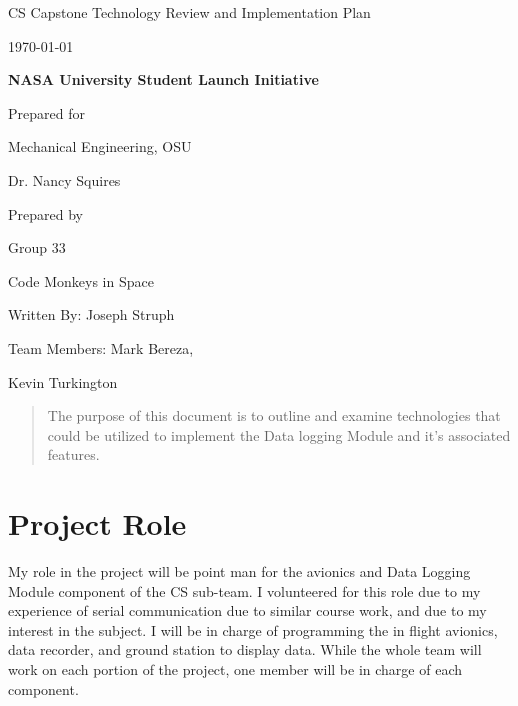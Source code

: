\documentclass[onecolumn, draftclsnofoot,10pt, compsoc]{IEEEtran}
\def \CapstoneTeamName{		Code Monkeys in Space}
\def \CapstoneTeamNumber{		33}
\def \GroupMemberOne{			Written By: Joseph Struph}
\def \GroupMemberTwo{			Team Members: Mark Bereza,}
\def \GroupMemberThree{			Kevin Turkington}
\def \CapstoneProjectName{		NASA University Student Launch Initiative}
\def \CapstoneSponsorCompany{	Mechanical Engineering, OSU}
\def \CapstoneSponsorPerson{		Dr. Nancy Squires}
\def \DocType{		Technology Review and Implementation Plan
				}
\newcommand{\NameSigPair}[1]{\par
\makebox[2.75in][r]{#1} \hfil 	\makebox[3.25in]{\makebox[2.25in]{\hrulefill} \hfill		\makebox[.75in]{\hrulefill}}
\par\vspace{-12pt} \textit{\tiny\noindent
\makebox[2.75in]{} \hfil		\makebox[3.25in]{\makebox[2.25in][r]{Signature} \hfill	\makebox[.75in][r]{Date}}}}
\renewcommand{\NameSigPair}[1]{#1}
\begin{document}
\begin{titlepage}
    \begin{singlespace}
        \hfill 
        \par\vspace{.2in}
        \centering
        \scshape{
            \huge CS Capstone \DocType \par
            {\large\today}\par
            \vspace{.5in}
            \textbf{\Huge\CapstoneProjectName}\par
            \vfill
            {\large Prepared for}\par
            \Huge \CapstoneSponsorCompany\par
            \vspace{5pt}
            {\Large\NameSigPair{\CapstoneSponsorPerson}\par}
            {\large Prepared by }\par
            Group\CapstoneTeamNumber\par
            \CapstoneTeamName\par 
            \vspace{5pt}
            {\Large
                \NameSigPair{\GroupMemberOne}\par
                \NameSigPair{\GroupMemberTwo}\par
                \NameSigPair{\GroupMemberThree}\par
            }
            \vspace{20pt}
        }
        \begin{abstract}
The purpose of this document is to outline and examine technologies that could be utilized to implement the Data logging Module and it's associated features. 
        \end{abstract}     
    \end{singlespace}
\end{titlepage}
\newpage
{}
\tableofcontents
\clearpage

\section{Project Role}
My role in the project will be point man for the avionics and Data Logging Module component of the CS sub-team. I volunteered for this role due to my experience of serial communication due to similar course work, and due to my interest in the subject. I will be in charge of programming the in flight avionics, data recorder, and ground station to display data. While the whole team will work on each portion of the project, one member will be in charge of each component.
\end{document}
